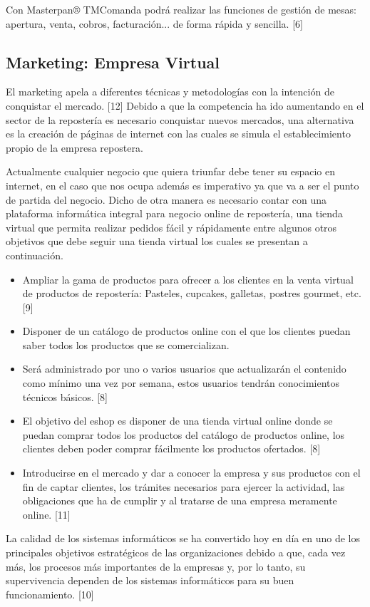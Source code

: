 \documentclass{bmcart}
\begin{document}
Con Masterpan® TMComanda podrá realizar las funciones de gestión de mesas: apertura, venta, cobros, facturación... de forma rápida y sencilla. [6]


\subsection{Marketing: Empresa Virtual}

El marketing apela a diferentes técnicas y metodologías con la intención de conquistar el mercado. [12]
Debido a que la competencia ha ido aumentando en el sector de la repostería es necesario conquistar nuevos mercados, una alternativa es la creación de páginas de internet con las cuales se simula el establecimiento propio de la empresa repostera.

Actualmente cualquier negocio que quiera triunfar debe tener su espacio en internet, en el caso que nos ocupa además es imperativo ya que va a ser el punto de partida del negocio.
Dicho de otra manera es necesario contar con una plataforma informática integral para negocio online de repostería, una tienda virtual que permita realizar pedidos fácil y rápidamente entre algunos otros objetivos que debe seguir una tienda virtual los cuales se presentan a continuación.
\newline
\newline

\begin{itemize}

\item Ampliar la gama de productos para ofrecer a los clientes en la venta virtual de productos de repostería: Pasteles, cupcakes, galletas, postres gourmet, etc.[9]

\item Disponer de un catálogo de productos online con el que los clientes puedan saber todos los productos que se comercializan.


\item Será administrado por uno o varios usuarios que actualizarán el contenido como mínimo una vez por semana, estos usuarios tendrán conocimientos técnicos básicos. [8]


\item El objetivo del eshop es disponer de una tienda virtual online donde se puedan comprar todos los productos del catálogo de productos online, los clientes deben poder comprar fácilmente los productos ofertados. [8]


\item Introducirse en el mercado y dar a conocer la empresa y sus productos con el fin de captar clientes, los trámites necesarios para ejercer la actividad, las obligaciones que ha de cumplir y al tratarse de una empresa meramente online. [11]
\newline
\newline
\end{itemize}
La calidad de los sistemas informáticos se ha convertido hoy en día en uno de los principales objetivos estratégicos de las organizaciones debido a que, cada vez más, los procesos más importantes de la empresas y, por lo tanto, su supervivencia dependen de los sistemas informáticos para su buen funcionamiento. [10]
\end{document}
